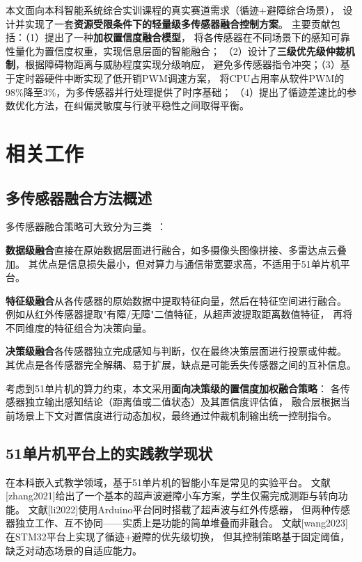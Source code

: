 \documentclass[12pt,a4paper]{ctexart}
\begin{document}
本文面向本科智能系统综合实训课程的真实赛道需求（循迹+避障综合场景），
设计并实现了一套\textbf{资源受限条件下的轻量级多传感器融合控制方案}。
主要贡献包括：（1）提出了一种\textbf{加权置信度融合模型}，
将各传感器在不同场景下的感知可靠性量化为置信度权重，实现信息层面的智能融合；
（2）设计了\textbf{三级优先级仲裁机制}，根据障碍物距离与威胁程度实现分级响应，
避免多传感器指令冲突；（3）基于定时器硬件中断实现了低开销PWM调速方案，
将CPU占用率从软件PWM的98\%降至3\%，为多传感器并行处理提供了时序基础；
（4）提出了循迹差速比的参数优化方法，在纠偏灵敏度与行驶平稳性之间取得平衡。

\section{相关工作}

\subsection{多传感器融合方法概述}

多传感器融合策略可大致分为三类~\cite{wang2023}：

\textbf{数据级融合}直接在原始数据层面进行融合，如多摄像头图像拼接、多雷达点云叠加。
其优点是信息损失最小，但对算力与通信带宽要求高，不适用于51单片机平台。

\textbf{特征级融合}从各传感器的原始数据中提取特征向量，然后在特征空间进行融合。
例如从红外传感器提取"有障/无障"二值特征，从超声波提取距离数值特征，
再将不同维度的特征组合为决策向量。

\textbf{决策级融合}各传感器独立完成感知与判断，仅在最终决策层面进行投票或仲裁。
其优点是各传感器完全解耦、易于扩展，缺点是可能丢失传感器之间的互补信息。

考虑到51单片机的算力约束，本文采用\textbf{面向决策级的置信度加权融合策略}：
各传感器独立输出感知结论（距离值或二值状态）及其置信度评估值，
融合层根据当前场景上下文对置信度进行动态加权，最终通过仲裁机制输出统一控制指令。

\subsection{51单片机平台上的实践教学现状}

在本科嵌入式教学领域，基于51单片机的智能小车是常见的实验平台。
文献[zhang2021]给出了一个基本的超声波避障小车方案，学生仅需完成测距与转向功能。
文献[li2022]使用Arduino平台同时搭载了超声波与红外传感器，
但两种传感器独立工作、互不协同——实质上是功能的简单堆叠而非融合。
文献[wang2023]在STM32平台上实现了循迹+避障的优先级切换，
但其控制策略基于固定阈值，缺乏对动态场景的自适应能力。
\end{document}
